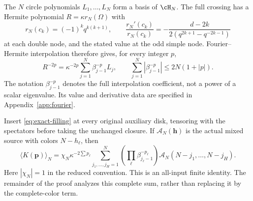The $N$ circle polynomials $L_1,\ldots,L_N$ form a basis of $\cH_N$. The full crossing has a Hermite polynomial $R=\kappa r_N(\Omega)$ with
\[
 r_N(c_k)=(-1)^kq^{k(k+1)},\qquad
 \frac{r_N'(c_k)}{r_N(c_k)}
 =-\frac{d-2k}{2(q^{2k+1}-q^{-2k-1})}
\]
at each double node, and the stated value at the odd simple node. Fourier--Hermite interpolation therefore gives, for every integer $p$,
\begin{equation}\label{eq:exact-filling}
 R^{-2p}=\kappa^{-2p}\sum_{j=1}^{N}\beta_{j-1}^{-p}L_j,
 \qquad \sum_{j=1}^{N}|\beta_{j-1}^{-p}|\le2N(1+|p|).
\end{equation}
The notation $\beta_{j-1}^{-p}$ denotes the full interpolation coefficient, not a power of a scalar eigenvalue. Its value and derivative data are specified in Appendix~\ref{app:fourier}.

Insert \eqref{eq:exact-filling} at every original auxiliary disk, tensoring with the spectators before taking the unchanged closure. If $\mathcal A_N(\mathbf h)$ is the actual mixed source with colors $N-h_\ell$, then
\begin{equation}\label{eq:whole-filling-source}
 \langle K(\mathbf p)\rangle_N
 =\chi_N\kappa^{-2\sum p_\ell}
 \sum_{j_1,\ldots,j_H=1}^{N}
 \left(\prod_\ell\beta_{j_\ell-1}^{-p_\ell}\right)
 \mathcal A_N(N-j_1,\ldots,N-j_H).
\end{equation}
Here $|\chi_N|=1$ in the reduced convention. This is an all-input finite identity. The remainder of the proof analyzes this complete sum, rather than replacing it by the complete-color term.
